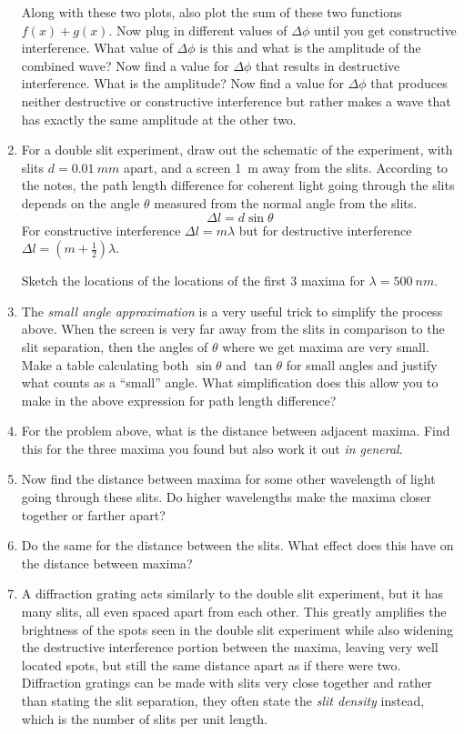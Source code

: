 \begin{enumerate}
Along with these two plots, also plot the sum of these two functions $f(x) + g(x)$. Now plug in different values of $\Delta\phi$ until you get constructive interference. What value of $\Delta\phi$ is this and what is the amplitude of the combined wave? Now find a value for $\Delta\phi$ that results in destructive interference. What is the amplitude? Now find a value for $\Delta\phi$ that produces neither destructive or constructive interference but rather makes a wave that has exactly the same amplitude at the other two.  

\newpage
\item
For a double slit experiment, draw out the schematic of the experiment, with slits $d=\SI{0.01}{mm}$ apart, and a screen \SI{1}{m} away from the slits. According to the notes, the path length difference for coherent light going through the slits depends on the angle $\theta$ measured from the normal angle from the slits. 
\[\Delta l = d \sin \theta\]
For constructive interference $\Delta l = m \lambda$ but for destructive interference $\Delta l = (m+\frac{1}{2})\lambda$.

Sketch the locations of the locations of the first 3 maxima for $\lambda=\SI{500}{nm}$. 

\item
The \emph{small angle approximation} is a very useful trick to simplify the process above. When the screen is very far away from the slits in comparison to the slit separation, then the angles of $\theta$ where we get maxima are very small. Make a table calculating both $\sin \theta$ and $\tan \theta$ for small angles and justify what counts as a ``small'' angle. What simplification does this allow you to make in the above expression for path length difference?

\item
For the problem above, what is the distance between adjacent maxima. Find this for the three maxima you found but also work it out \emph{in general}.

\item
Now find the distance between maxima for some other wavelength of light going through these slits. Do higher wavelengths make the maxima closer together or farther apart? 

\item 
Do the same for the distance between the slits. What effect does this have on the distance between maxima?

\item
A diffraction grating acts similarly to the double slit experiment, but it has many slits, all even spaced apart from each other. This greatly amplifies the brightness of the spots seen in the double slit experiment while also widening the destructive interference portion between the maxima, leaving very well located spots, but still the same distance apart as if there were two. Diffraction gratings can be made with slits very close together and rather than stating the slit separation, they often state the \emph{slit density} instead, which is the number of slits per unit length.


\end{enumerate}
